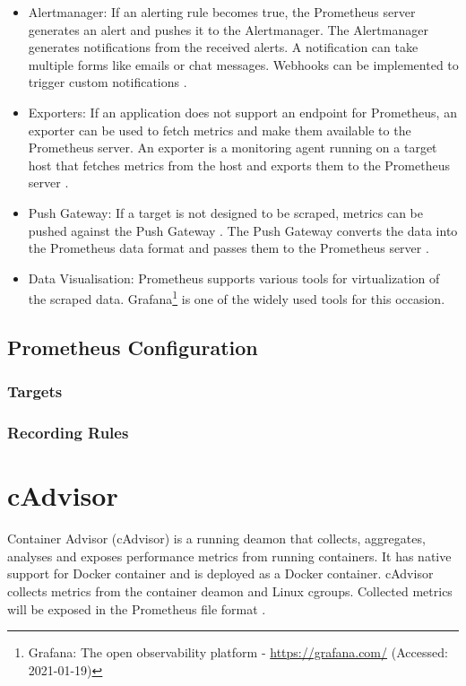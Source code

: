 \begin{itemize}
\item Alertmanager:
If an alerting rule becomes true, the Prometheus server generates an alert and pushes it to the Alertmanager. The Alertmanager generates notifications from the received alerts. A notification can take multiple forms like emails or chat messages. Webhooks can be implemented to trigger custom notifications \cite{Bastos2019Prom}.

\item Exporters:
If an application does not support an endpoint for Prometheus, an exporter can be used to fetch metrics and make them available to the Prometheus server. An exporter is a monitoring agent running on a target host that fetches metrics from the host and exports them to the Prometheus server \cite{Pandey2020Monitoring}.

\item Push Gateway:
If a target is not designed to be scraped, metrics can be pushed against the Push Gateway \cite{Prom2020Docs}. The Push Gateway converts the data into the Prometheus data format and passes them to the Prometheus server \cite{Pandey2020Monitoring}.

\item Data Visualisation:
Prometheus supports various tools for virtualization of the scraped data. Grafana\footnote{Grafana: The open observability platform - \url{https://grafana.com/} (Accessed: 2021-01-19)} is one of the widely used tools for this occasion.
\end{itemize}


\subsection{Prometheus Configuration}


\subsubsection{Targets}


\subsubsection{Recording Rules}


\section{cAdvisor}
Container Advisor (cAdvisor) is a running deamon that collects, aggregates, analyses and exposes performance metrics from running containers.
It has native support for Docker container and is deployed as a Docker container.
cAdvisor collects metrics from the container deamon and Linux cgroups.
Collected metrics will be exposed in the Prometheus file format \cite{Bastos2019Prom, cadvisor2020Docs}.


